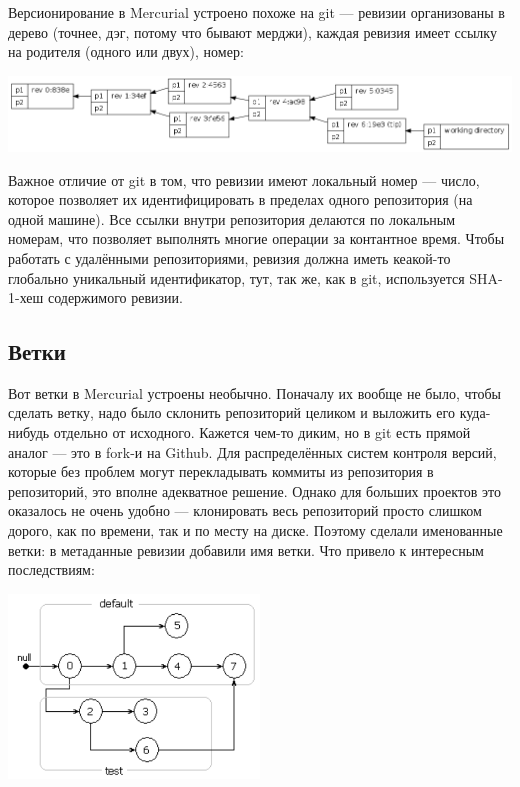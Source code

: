 \documentclass[a5paper]{article}
\begin{document}
Версионирование в Mercurial устроено похоже на git --- ревизии организованы в дерево (точнее, дэг, потому что бывают мерджи), каждая ревизия имеет ссылку на родителя (одного или двух), номер:

\begin{center}
    \includegraphics[width=\textwidth]{mercurialRevisions.png}
\end{center}

Важное отличие от git в том, что ревизии имеют локальный номер --- число, которое позволяет их идентифицировать в пределах одного репозитория (на одной машине). Все ссылки внутри репозитория делаются по локальным номерам, что позволяет выполнять многие операции за контантное время. Чтобы работать с удалёнными репозиториями, ревизия должна иметь кеакой-то глобально уникальный идентификатор, тут, так же, как в git, используется SHA-1-хеш содержимого ревизии.

\subsection{Ветки}

Вот ветки в Mercurial устроены необычно. Поначалу их вообще не было, чтобы сделать ветку, надо было склонить репозиторий целиком и выложить его куда-нибудь отдельно от исходного. Кажется чем-то диким, но в git есть прямой аналог --- это в fork-и на Github. Для распределённых систем контроля версий, которые без проблем могут перекладывать коммиты из репозитория в репозиторий, это вполне адекватное решение. Однако для больших проектов это оказалось не очень удобно --- клонировать весь репозиторий просто слишком дорого, как по времени, так и по месту на диске. Поэтому сделали именованные ветки: в метаданные ревизии добавили имя ветки. Что привело к интересным последствиям:

\begin{center}
    \includegraphics[width=0.5\textwidth]{mercurialBranches.png}
\end{center}
\end{document}
